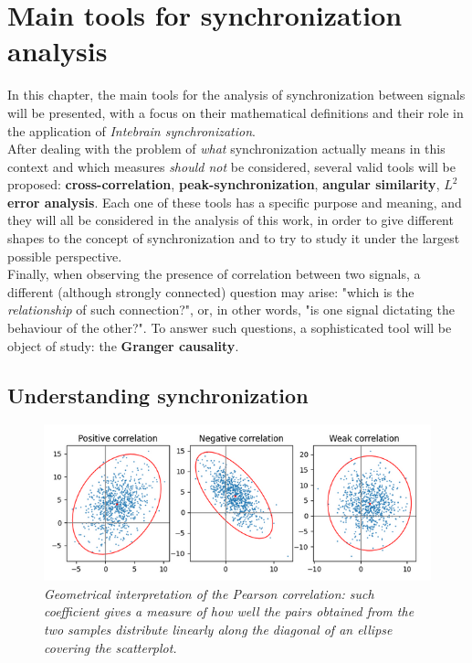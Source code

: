 \documentclass[a4paper]{article}
\begin{document}
	
	
\section{Main tools for synchronization analysis}

In this chapter, the main tools for the analysis of synchronization between signals will be presented, with a focus on their mathematical definitions and their role in the application of \textit{Intebrain synchronization}.\\
After dealing with the problem of \textit{what} synchronization actually means in this context and which measures \textit{should not} be considered, several valid tools will be proposed:\textbf{ cross-correlation}, \textbf{peak-synchronization}, \textbf{angular similarity}, \textbf{$L^2$ error analysis}. Each one of these tools has a specific purpose and meaning, and they will all be considered in the analysis of this work, in order to give different shapes to the concept of synchronization and to try to study it under the largest possible perspective.\\
Finally, when observing the presence of correlation between two signals, a different (although strongly connected) question may arise: "which is the \textit{relationship} of such connection?", or, in other words, "is one signal dictating the behaviour of the other?". To answer such questions, a sophisticated tool will be object of study: the \textbf{Granger causality}.


\subsection{Understanding synchronization}

\begin{figure}[H]
	\begin{center}
		\includegraphics[scale=.75]{pearson.png} 
	\end{center} 
	\caption{\textit{Geometrical interpretation of the Pearson correlation: such coefficient gives a measure of how well the pairs obtained from the two samples distribute linearly along the diagonal of an ellipse covering the scatterplot. }}
	
\end{figure}
\end{document}
